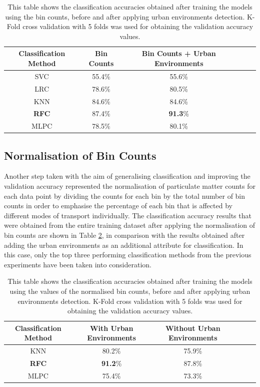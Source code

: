 \documentclass[bsc,frontabs,twoside,singlespacing,parskip,deptreport]{infthesis}     %
\begin{document}
\begin{table}[h!]
\centering
 \begin{tabular}{||c | c | c | c | c | c||} 
 \hline
 Classification Method & Bin Counts & Bin Counts + Urban Environments \\ [0.5ex] 
 \hline\hline
 SVC & 55.4\% & 55.6\% \\ 
 \hline
 LRC & 78.6\% & 80.5\% \\
 \hline
 KNN & 84.6\% & 84.6\% \\ 
 \hline
 \textbf{RFC} & 87.4\% & \textbf{91.3}\% \\ 
 \hline
  MLPC & 78.5\% & 80.1\% \\ 
 \hline
\end{tabular}
\caption{This table shows the classification accuracies obtained after training the models using the bin counts, before and after applying urban environments detection. K-Fold cross validation with 5 folds was used for obtaining the validation accuracy values.}
\label{table:urban-env-models}
\end{table}


\subsection{Normalisation of Bin Counts}
\label{subsec:norm-bin-counts-results}

Another step taken with the aim of generalising classification and improving the validation accuracy represented the normalisation of particulate matter counts for each data point by dividing the counts for each bin by the total number of bin counts in order to emphasise the percentage of each bin that is affected by different modes of transport individually. The classification accuracy results that were obtained from the entire training dataset after applying the normalisation of bin counts are shown in Table \ref{table:norm-bin-counts}, in comparison with the results obtained after adding the urban environments as an additional attribute for classification. In this case, only the top three performing classification methods from the previous experiments have been taken into consideration.


\begin{table}[h!]
\centering
 \begin{tabular}{||c | c | c | c | c | c||} 
 \hline
 Classification Method & With Urban Environments & Without Urban Environments \\ [0.5ex] 
 \hline\hline
 KNN & 80.2\% & 75.9\% \\
 \hline
 \textbf{RFC} & \textbf{91.2}\% & 87.8\% \\ 
 \hline
  MLPC & 75.4\% & 73.3\% \\ 
 \hline
\end{tabular}
\caption{This table shows the classification accuracies obtained after training the models using the values of the normalised bin counts, before and after applying urban environments detection. K-Fold cross validation with 5 folds was used for obtaining the validation accuracy values.}
\label{table:norm-bin-counts}
\end{table}
\end{document}
